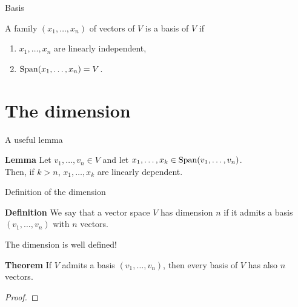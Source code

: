 \documentclass{beamer}
\begin{document}
\begin{frame}[t]{Basis}
	\grid
	\vspace{-0.5cm}
	\begin{exampleblock}{}
		A family $(x_1, \dots, x_n)$ of vectors of $V$ is a basis of $V$ if
		\begin{enumerate}
			\item $x_1, \dots, x_n$ are linearly independent,
			\item ${{\rm Span}}(x_1, \dots, x_n) = V$.
		\end{enumerate}
	\end{exampleblock}
\end{frame}

\section{The dimension}

\begin{frame}[t]{A useful lemma}
	\grid
	\vspace{-0.4cm}
	\begin{block}{\bf Lemma}
		Let $v_1, \dots, v_n \in V$
		and let $x_1, \dots, x_k \in {{\rm Span}}(v_1, \dots, v_n)$.
		\\
		Then, if $k > n$,
		$x_1, \dots, x_k$ are linearly dependent.
	\end{block}
\end{frame}

\begin{frame}[t]{Definition of the dimension}
	\grid
	\begin{block}{\bf Definition}
		We say that a vector space $V$ has dimension $n$ if it admits a basis $(v_1, \dots, v_n)$ with $n$ vectors.
	\end{block}
\end{frame}

\begin{frame}[t]{The dimension is well defined!}
	\grid
	\vspace{-0.3cm}
	\begin{block}{\bf Theorem}
		If $V$ admits a basis $(v_1, \dots, v_n)$, then every basis of $V$ has also $n$ vectors. 
	\end{block}
	\begin{proof}
		\vspace{4.5cm}
		\vfill
	\end{proof}
\end{frame}
\end{document}
